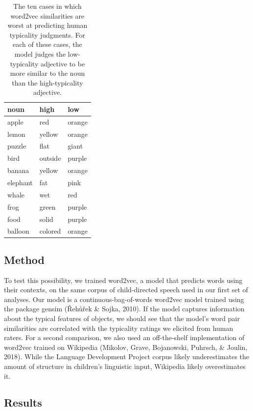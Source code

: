 \documentclass[10pt, letterpaper]{article}
\begin{document}
\begin{table}[tb]
\centering
\begin{tabular}{lll}
  \hline
noun & high & low \\ 
  \hline
apple & red & orange \\ 
  lemon & yellow & orange \\ 
  puzzle & flat & giant \\ 
  bird & outside & purple \\ 
  banana & yellow & orange \\ 
  elephant & fat & pink \\ 
  whale & wet & red \\ 
  frog & green & purple \\ 
  food & solid & purple \\ 
  balloon & colored & orange \\ 
   \hline
\end{tabular}
\caption{The ten cases in which word2vec similarities are worst at predicting human typicality judgments. For each of these cases, the model judges the low-typicality adjective to be more similar to the noun than the high-typicality adjective.} 
\label{tab:pairs_tab}
\end{table}

\hypertarget{method}{%
\subsection{Method}\label{method}}

To test this possibility, we trained word2vec, a model that predicts
words using their contexts, on the same corpus of child-directed speech
used in our first set of analyses. Our model is a
continuous-bag-of-words word2vec model trained using the package gensim
(Řehůřek \& Sojka, 2010). If the model captures information about the
typical features of objects, we should see that the model's word pair
similarities are correlated with the typicality ratings we elicited from
human raters. For a second comparison, we also used an off-the-shelf
implementation of word2vec trained on Wikipedia (Mikolov, Grave,
Bojanowski, Puhrsch, \& Joulin, 2018). While the Language Development
Project corpus likely underestimates the amount of structure in
children's linguistic input, Wikipedia likely overestimates it.

\hypertarget{results-1}{%
\subsection{Results}\label{results-1}}
\end{document}
